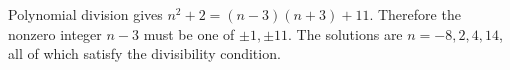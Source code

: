 Polynomial division gives $n^2+2=(n-3)(n+3)+11$. Therefore the nonzero integer $n-3$ must be one of $\pm1,\pm11$. The solutions are $\boxed{n=-8,2,4,14}$, all of which satisfy the divisibility condition.
